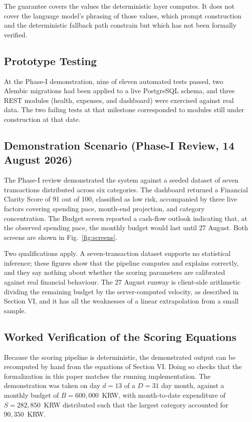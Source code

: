 \documentclass[conference]{IEEEtran}
\begin{document}
The guarantee covers the values the deterministic layer computes. It does not cover the language model's phrasing of those values, which prompt construction and the deterministic fallback path constrain but which has not been formally verified.

\subsection{Prototype Testing}

At the Phase-I demonstration, nine of eleven automated tests passed, two Alembic migrations had been applied to a live PostgreSQL schema, and three REST modules (health, expenses, and dashboard) were exercised against real data. The two failing tests at that milestone corresponded to modules still under construction at that date.

\subsection{Demonstration Scenario (Phase-I Review, 14 August 2026)}

The Phase-I review demonstrated the system against a seeded dataset of seven transactions distributed across six categories. The dashboard returned a Financial Clarity Score of 91 out of 100, classified as low risk, accompanied by three live factors covering spending pace, month-end projection, and category concentration. The Budget screen reported a cash-flow outlook indicating that, at the observed spending pace, the monthly budget would last until 27 August. Both screens are shown in Fig.~\ref{fig:screens}.

Two qualifications apply. A seven-transaction dataset supports no statistical inference; these figures show that the pipeline computes and explains correctly, and they say nothing about whether the scoring parameters are calibrated against real financial behaviour. The 27 August runway is client-side arithmetic dividing the remaining budget by the server-computed velocity, as described in Section VI, and it has all the weaknesses of a linear extrapolation from a small sample.

\subsection{Worked Verification of the Scoring Equations}

Because the scoring pipeline is deterministic, the demonstrated output can be recomputed by hand from the equations of Section VI. Doing so checks that the formalization in this paper matches the running implementation. The demonstration was taken on day $d = 13$ of a $D = 31$ day month, against a monthly budget of $B = 600{,}000$~KRW, with month-to-date expenditure of $S = 282{,}850$~KRW distributed such that the largest category accounted for $90{,}350$~KRW.
\end{document}
